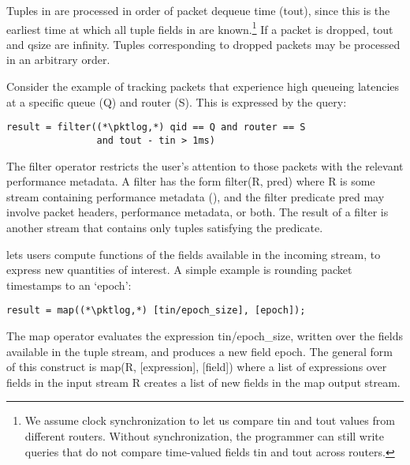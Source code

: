 Tuples in {\ct \pktlog} are processed in
order of packet dequeue time
({\ct tout}), since this is the earliest time at which all tuple fields in {\ct
\pktlog} are known.\footnote{We assume clock synchronization
to let us compare {\ctfoot tin} and {\ctfoot tout} values from different
routers. Without
synchronization, the programmer can still write queries
that do not compare time-valued fields {\ctfoot tin} and {\ctfoot tout} across
routers.}
%
%
If a packet is dropped, {\ct tout} and {\ct qsize} are {\ct
infinity.} Tuples corresponding to dropped packets may be processed in an
arbitrary order.

 Consider the
example of tracking packets that experience high queueing latencies at a
specific queue ({\ct Q}) and router ({\ct S}). This is expressed by
the query:
\begin{lstlisting}
result = filter((*\pktlog,*) qid == Q and router == S
                and tout - tin > 1ms)
\end{lstlisting}
The {\ct filter} operator restricts the user's attention to those packets with
the relevant performance metadata. A filter has the form {\ct filter(R, pred)}
where {\ct R} is some stream containing performance metadata (\eg {\ct
\pktlog}), and the filter predicate {\ct pred} may involve packet headers,
performance metadata, or both. The result of a {\ct filter} is another stream that
contains only tuples satisfying the predicate.

 \TheSystem lets users compute
functions of the fields available in the incoming stream, to express new quantities
of interest. A simple example is rounding packet timestamps to an `epoch':
\begin{lstlisting}
result = map((*\pktlog,*) [tin/epoch_size], [epoch]);
\end{lstlisting}
The {\ct map} operator evaluates the expression {\ct tin/epoch\_size}, written over the
fields available in the tuple stream, and produces a new field {\ct
  epoch}. The general form of this construct is {\ct map(R, [expression],
  [field])} where a list of {\ct expression}s over fields in the input stream
{\ct R} creates a list of new {\ct field}s in the {\ct map} output stream.

